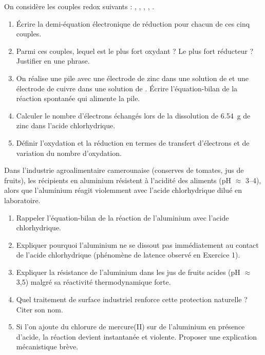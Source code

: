 \documentclass[11pt]{article}
\begin{document}
\begin{exercice}
On considère les couples redox suivants : , , , , .

\begin{enumerate}
\item Écrire la demi-équation électronique de réduction pour chacun de ces cinq couples.
\item Parmi ces couples, lequel est le plus fort oxydant ? Le plus fort réducteur ? Justifier en une phrase.
\item On réalise une pile avec une électrode de zinc dans une solution de  et une électrode de cuivre dans une solution de . Écrire l'équation-bilan de la réaction spontanée qui alimente la pile.
\item Calculer le nombre d'électrons échangés lors de la dissolution de \SI{6,54}{\gram} de zinc dans l'acide chlorhydrique.
\item Définir l'oxydation et la réduction en termes de transfert d'électrons et de variation du nombre d'oxydation.
\end{enumerate}
\end{exercice}

\begin{exercice}
Dans l'industrie agroalimentaire camerounaise (conserves de tomates, jus de fruits), les récipients en aluminium résistent à l'acidité des aliments (pH $\approx$ 3--4), alors que l'aluminium réagit violemment avec l'acide chlorhydrique dilué en laboratoire.

\begin{enumerate}
\item Rappeler l'équation-bilan de la réaction de l'aluminium avec l'acide chlorhydrique.
\item Expliquer pourquoi l'aluminium ne se dissout pas immédiatement au contact de l'acide chlorhydrique (phénomène de latence observé en Exercice 1).
\item Expliquer la résistance de l'aluminium dans les jus de fruits acides (pH $\approx$ 3,5) malgré sa réactivité thermodynamique forte.
\item Quel traitement de surface industriel renforce cette protection naturelle ? Citer son nom.
\item Si l'on ajoute du chlorure de mercure(II)  sur de l'aluminium en présence d'acide, la réaction devient instantanée et violente. Proposer une explication mécanistique brève.
\end{enumerate}
\end{exercice}
\end{document}
